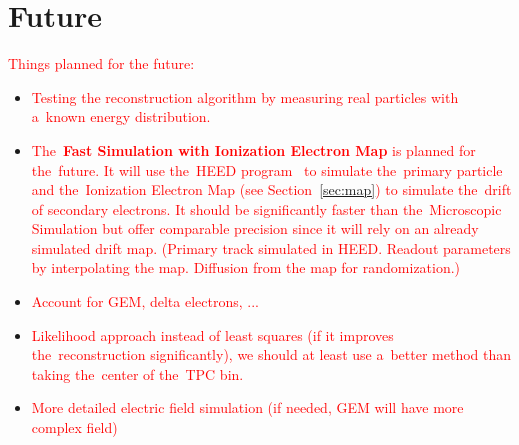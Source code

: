 	\section*{Future}
		\textcolor{red}{Things planned for the future:}
		\begin{itemize}
			\item \textcolor{red}{Testing the reconstruction algorithm by measuring real particles with a~known energy distribution.}
			\item \textcolor{red}{The~\textbf{Fast Simulation with Ionization Electron Map} is planned for the~future. It will use the~\ac{HEED} program~\cite{HEED} to simulate the~primary particle and the~Ionization Electron Map (see Section~\ref{sec:map}) to simulate the~drift of secondary electrons. It should be significantly faster than the~Microscopic Simulation but offer comparable precision since it will rely on an already simulated drift map. (Primary track simulated in HEED. Readout parameters by interpolating the map.	Diffusion from the map for randomization.)}
			\item \textcolor{red}{Account for GEM, delta electrons, ...}
			\item \textcolor{red}{Likelihood approach instead of least squares (if it improves the~reconstruction significantly), we should at least use a~better method than taking the~center of the~TPC bin.}
			\item \textcolor{red}{More detailed electric field simulation (if needed, GEM will have more complex field)}
		\end{itemize}
		
